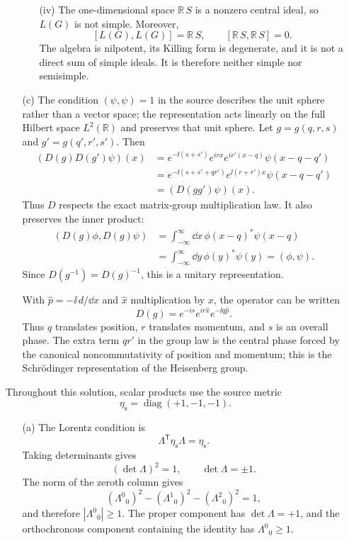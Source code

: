 \begin{enumerate}
\begin{enumerate}
\begin{enumerate}
  \item[(iv)] The one-dimensional space \(\mathbb R\,S\) is a nonzero
  central ideal, so \(L(G)\) is not simple.  Moreover,
  \[
   [L(G),L(G)]=\mathbb R\,S,\qquad
   [\mathbb R\,S,\mathbb R\,S]=0.
  \]
  The algebra is nilpotent, its Killing form is degenerate, and it is
  not a direct sum of simple ideals.  It is therefore neither simple nor
  semisimple.
  \end{enumerate}

\item[(c)] The condition \((\psi,\psi)=1\) in the source describes the
unit sphere rather than a vector space; the representation acts linearly
on the full Hilbert space \(L^2(\mathbb R)\) and preserves that unit
sphere.  Let \(g=g(q,r,s)\) and \(g'=g(q',r',s')\).  Then
\[
\begin{split}
 (D(g)D(g')\psi)(x)
 &=e^{-\ii(s+s')}e^{irx}e^{ir'(x-q)}
   \psi(x-q-q')\\
 &=e^{-\ii(s+s'+qr')}e^{\ii(r+r')x}
   \psi(x-q-q')\\
 &=(D(gg')\psi)(x).
\end{split}
\]
Thus \(D\) respects the exact matrix-group multiplication law.  It also
preserves the inner product:
\[
\begin{split}
 (D(g)\phi,D(g)\psi)
 &=\int_{-\infty}^{\infty}\dd x\,
   \phi(x-q)^*\psi(x-q)\\
 &=\int_{-\infty}^{\infty}\dd y\,\phi(y)^*\psi(y)
 = (\phi,\psi).
\end{split}
\]
Since \(D(g^{-1})=D(g)^{-1}\), this is a unitary representation.

With \(\widehat p=-\ii\,d/\dd x\) and \(\widehat x\) multiplication by \(x\),
the operator can be written
\[
 D(g)=e^{-is}e^{ir\widehat x}e^{-\ii q\widehat p}.
\]
Thus \(q\) translates position, \(r\) translates momentum, and \(s\) is
an overall phase.  The extra term \(qr'\) in the group law is the central
phase forced by the canonical noncommutativity of position and momentum;
this is the Schr\"odinger representation of the Heisenberg group.
\end{enumerate}

Throughout this solution, scalar products use the source metric
\[
 \eta_{\mathrm s}=\operatorname{diag}(+1,-1,-1).
\]
\begin{enumerate}
\item[(a)] The Lorentz condition is
\[
 \Lambda^{\mathsf T}\eta_{\mathrm s}\Lambda=\eta_{\mathrm s}.
\]
Taking determinants gives
\[
 (\det\Lambda)^2=1,
 \qquad \det\Lambda=\pm1.
\]
The norm of the zeroth column gives
\[
 (\Lambda^0{}_{0})^2-(\Lambda^1{}_{0})^2
 -(\Lambda^2{}_{0})^2=1,
\]
and therefore \(|\Lambda^0{}_{0}|\ge1\).  The proper component has
\(\det\Lambda=+1\), and the orthochronous component containing the
identity has \(\Lambda^0{}_{0}\ge1\).


\end{enumerate}
\end{enumerate}
